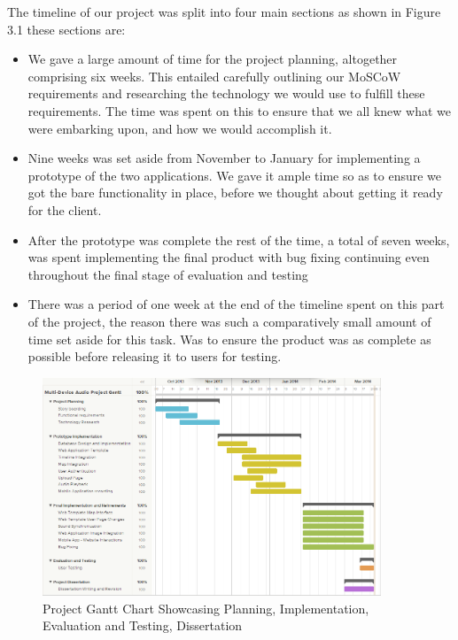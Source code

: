 \documentclass{l3proj}
\begin{document}
The timeline of our project was split into four main sections as shown in Figure 3.1 these sections are:
\begin{itemize}
\item{  We gave a large amount of time for the project planning, altogether comprising six weeks. This entailed carefully outlining our MoSCoW requirements and researching the technology we would use to fulfill these requirements. The time was spent on this to ensure that we all knew what we were embarking upon, and how we would accomplish it.}
\item{  Nine weeks was set aside from November to January for implementing a prototype of the two applications. We gave it ample time so as to ensure we got the bare functionality in place, before we thought about getting it ready for the client.}
\item{  After the prototype was complete the rest of the time, a total of seven weeks, was spent implementing the final product with bug fixing continuing even throughout the final stage of evaluation and testing}
\item{  There was a period of one week at the end of the timeline spent on this part of the project, the reason there was such a comparatively small amount of time set aside for this task. Was to ensure the product was as complete as possible before releasing it to users for testing.}
\end{itemize}
\begin{figure}[ht!]
  \centering
\includegraphics[width=0.9\textwidth]{images/gantt.png}
\caption{Project Gantt Chart Showcasing Planning, Implementation, Evaluation and Testing, Dissertation}
\end{figure}
\end{document}
